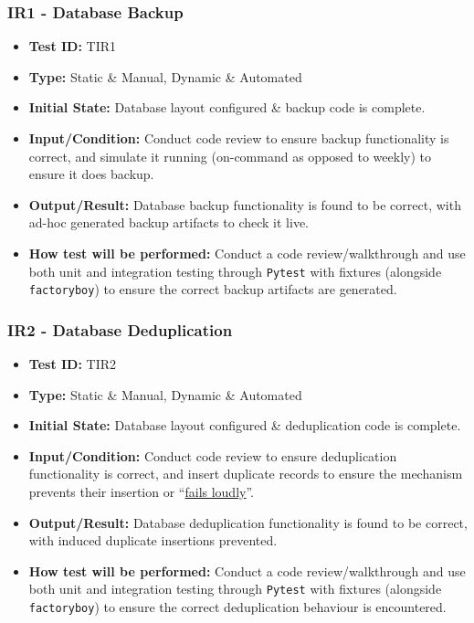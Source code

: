 \documentclass[12pt, titlepage]{article}
\begin{document}
\subsubsection{IR1 - Database Backup}
\begin{itemize}
    \item \textbf{Test ID:} TIR1
    \item \textbf{Type:} Static \& Manual, Dynamic \& Automated
    \item \textbf{Initial State:} Database layout configured \& backup code is complete.
    \item \textbf{Input/Condition:} Conduct code review to ensure backup functionality is correct, and simulate it running (on-command as opposed to weekly) to ensure it does backup.
    \item \textbf{Output/Result:} Database backup functionality is found to be correct, with ad-hoc generated backup artifacts to check it live.
    \item \textbf{How test will be performed:} Conduct a code review/walkthrough and use both unit and integration testing through \texttt{Pytest} with fixtures (alongside \texttt{factoryboy}) to ensure the correct backup artifacts are generated.
\end{itemize}

\subsubsection{IR2 - Database Deduplication}
\begin{itemize}
    \item \textbf{Test ID:} TIR2
    \item \textbf{Type:} Static \& Manual, Dynamic \& Automated
    \item \textbf{Initial State:} Database layout configured \& deduplication code is complete.
    \item \textbf{Input/Condition:} Conduct code review to ensure deduplication functionality is correct, and insert duplicate records to ensure the mechanism prevents their insertion or ``\href{https://oncodingstyle.blogspot.com/2008/10/fail-early-fail-loudly.html#:~:text=Failing%20loudly%20is%20a%20benefit,this%20is%20a%20checked%20exception.}{fails loudly}''.
    \item \textbf{Output/Result:} Database deduplication functionality is found to be correct, with induced duplicate insertions prevented.
    \item \textbf{How test will be performed:} Conduct a code review/walkthrough and use both unit and integration testing through \texttt{Pytest} with fixtures (alongside \texttt{factoryboy}) to ensure the correct deduplication behaviour is encountered.
\end{itemize}
\end{document}
